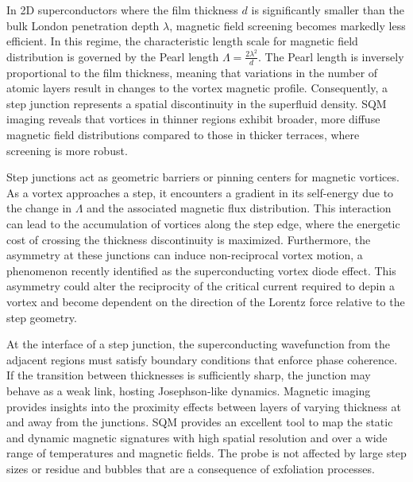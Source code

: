 In 2D superconductors where the film thickness $d$ is significantly smaller than the bulk London penetration depth $\lambda$, magnetic field screening becomes markedly less efficient. In this regime, the characteristic length scale for magnetic field distribution is governed by the Pearl length $\Lambda = \frac{2\lambda^2}{d}$. The Pearl length is inversely proportional to the film thickness, meaning that variations in the number of atomic layers result in changes to the vortex magnetic profile. Consequently, a step junction represents a spatial discontinuity in the superfluid density. \gls{SQM} imaging reveals that vortices in thinner regions exhibit broader, more diffuse magnetic field distributions compared to those in thicker terraces, where screening is more robust\cite{jayaramProbingVortexDynamics2025,fridmanAnomalousThicknessDependence2025}. 

Step junctions act as geometric barriers or pinning centers for magnetic vortices. As a vortex approaches a step, it encounters a gradient in its self-energy due to the change in $\Lambda$ and the associated magnetic flux distribution\cite{agassiThicknessdependentPinningSuperconductor2007}. This interaction can lead to the accumulation of vortices along the step edge, where the energetic cost of crossing the thickness discontinuity is maximized. Furthermore, the asymmetry at these junctions can induce non-reciprocal vortex motion, a phenomenon recently identified as the superconducting vortex diode effect\cite{gutfreundDirectObservationSuperconducting2023}. This asymmetry could alter the reciprocity of the critical current required to depin a vortex and become dependent on the direction of the Lorentz force relative to the step geometry\cite{suriNonreciprocityVortexlimitedCritical2022,leeReducingVortexDensity1999}.

At the interface of a step junction, the superconducting wavefunction from the adjacent regions must satisfy boundary conditions that enforce phase coherence. If the transition between thicknesses is sufficiently sharp, the junction may behave as a weak link, hosting Josephson-like dynamics\cite{yabukiSupercurrentVanWaals2016}. Magnetic imaging provides insights into the proximity effects between layers of varying thickness at and away from the junctions. \gls{SQM} provides an excellent tool to map the static and dynamic magnetic signatures with high spatial resolution and over a wide range of temperatures and magnetic fields. The probe is not affected by large step sizes or residue and bubbles that are a consequence of exfoliation processes.

